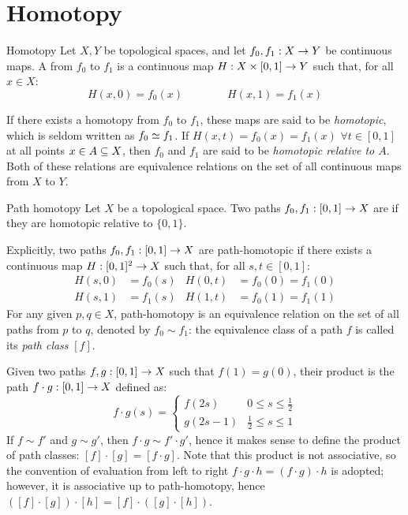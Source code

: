 
\section{Homotopy}
\label{sec:homotopy}

\begin{definition}{Homotopy}{}
  Let $ X,Y $ be topological spaces, and let $ f_0 , f_1 : X \rightarrow Y $ be continuous maps. A  from $ f_0 $ to $ f_1 $ is a continuous map $ H : X \times [0,1] \rightarrow Y $ such that, for all $ x \in X $:
  \begin{equation*}
    H(x,0) = f_0(x)
    \qquad \qquad
    H(x,1) = f_1(x)
  \end{equation*}
\end{definition}

If there exists a homotopy from $ f_0 $ to $ f_1 $, these maps are said to be \emph{homotopic}, which is seldom written as $ f_0 \simeq f_1 $. If $ H(x,t) = f_0(x) = f_1(x) \,\,\forall t \in [0,1] $ at all points $ x \in A \subseteq X $, then $ f_0 $ and $ f_1 $ are said to be \emph{homotopic relative to $ A $}. Both of these relations are equivalence relations on the set of all continuous maps from $ X $ to $ Y $.

\begin{definition}{Path homotopy}{}
  Let $ X $ be a topological space. Two paths $ f_0 , f_1 : [0,1] \rightarrow X $ are  if they are homotopic relative to $ \{0,1\} $.
\end{definition}

Explicitly, two paths $ f_0 , f_1 : [0,1] \rightarrow X $ are path-homotopic if there exists a continuous map $ H : [0,1]^2 \rightarrow X $ such that, for all $ s,t \in [0,1] $:
\begin{align*}
  H(s,0) &= f_0(s) & H(0,t) &= f_0(0) = f_1(0) \\
  H(s,1) &= f_1(s) & H(1,t) &= f_0(1) = f_1(1)
\end{align*}
For any given $ p,q \in X $, path-homotopy is an equivalence relation on the set of all paths from $ p $ to $ q $, denoted by $ f_0 \sim f_1 $: the equivalence class of a path $ f $ is called its \emph{path class} $ [f] $.

Given two paths $ f,g : [0,1] \rightarrow X $ such that $ f(1) = g(0) $, their product is the path $ f \cdot g : [0,1] \rightarrow X $ defined as:
\begin{equation}
  f \cdot g (s) =
  \begin{cases}
    f(2s) & 0 \leq s \leq \frac{1}{2} \\
    g(2s - 1) & \frac{1}{2} \leq s \leq 1
  \end{cases}
  \label{eq:path-product}
\end{equation}
If $ f \sim f' $ and $ g \sim g' $, then $ f \cdot g \sim f' \cdot g' $, hence it makes sense to define the product of path classes: $ [f] \cdot [g] = [f \cdot g] $. Note that this product is not associative, so the convention of evaluation from left to right $ f \cdot g \cdot h = (f \cdot g) \cdot h $ is adopted; however, it is associative up to path-homotopy, hence $ ([f] \cdot [g]) \cdot [h] = [f] \cdot ([g] \cdot [h]) $.

